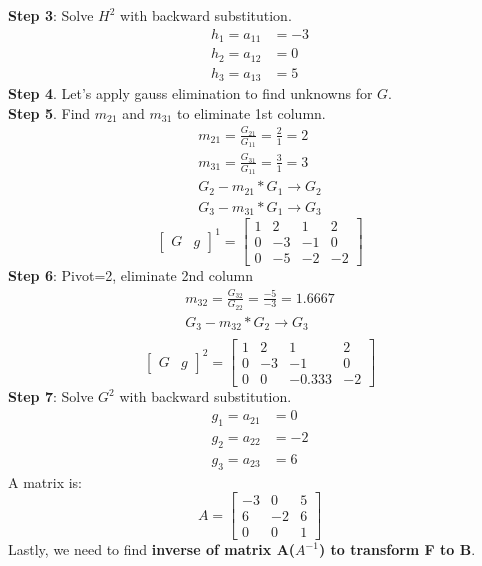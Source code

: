 \documentclass{article}
\begin{document}
\textbf{Step 3}: Solve $H^2$ with backward substitution.
\begin{align}
	h_1=a_{11}&=-3\\h_2=a_{12}&=0\\h_3=a_{13}&=5
\end{align}
\textbf{Step 4}. Let's apply gauss elimination to find unknowns for $G$.\\
\textbf{Step 5}. Find $m_{21}$ and $m_{31}$ to eliminate 1st column.\\
\begin{align}
	m_{21}=\frac{G_{21}}{G_{11}}=\frac{2}{1}=2\\
	m_{31}=\frac{G_{31}}{G_{11}}=\frac{3}{1}=3\\
	G_2-m_{21}*G_1 \rightarrow  G_2\\
	G_3-m_{31}*G_1 \rightarrow  G_3
\end{align}
\[
\left[
\begin{array}{c|c}
G&g
\end{array}
\right]^1
=
\left[
\begin{array}{ccc|c}
	1&2&1&2\\
	0&-3&-1&0\\
	0&-5&-2&-2 
\end{array}
\right]
\]
\textbf{Step 6}: Pivot=2, eliminate 2nd column
\begin{align}
	m_{32}=\frac{G_{32}}{G_{22}}=\frac{-5}{-3}=1.6667\\
	G_3-m_{32}*G_2 \rightarrow  G_3\\
\end{align}
\[
\left[
\begin{array}{c|c}
G&g
\end{array}
\right]^2
=
\left[
\begin{array}{ccc|c}
	1&2&1&2\\
	0&-3&-1&0\\
	0&0&-0.333&-2
\end{array}
\right]
\]
\textbf{Step 7}: Solve $G^2$ with backward substitution.
\begin{align}
	g_1=a_{21}&=0\\g_2=a_{22}&=-2\\g_3=a_{23}&=6
\end{align}
A matrix is:
\[
A
=
\begin{bmatrix}
	-3&0&5\\
	6&-2&6\\
	0&0&1
\end{bmatrix}
\]
Lastly, we need to find \textbf{inverse of matrix A($A^{-1}$) to transform F to B}.
\end{document}
